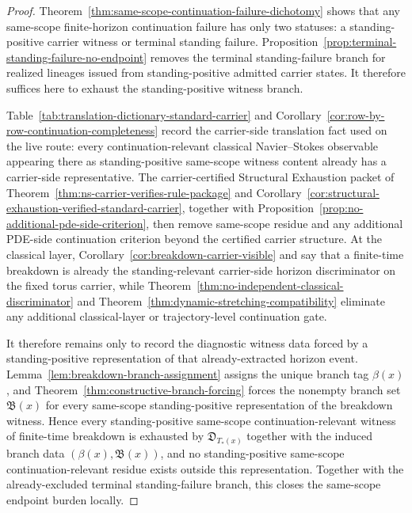 \begin{proof}
Theorem~\ref{thm:same-scope-continuation-failure-dichotomy} shows that any same-scope finite-horizon continuation failure has only two statuses: a standing-positive carrier witness or terminal standing failure. Proposition~\ref{prop:terminal-standing-failure-no-endpoint} removes the terminal standing-failure branch for realized lineages issued from standing-positive admitted carrier states. It therefore suffices here to exhaust the standing-positive witness branch.

Table~\ref{tab:translation-dictionary-standard-carrier} and Corollary~\ref{cor:row-by-row-continuation-completeness} record the carrier-side translation fact used on the live route: every continuation-relevant classical Navier--Stokes observable appearing there as standing-positive same-scope witness content already has a carrier-side representative. The carrier-certified Structural Exhaustion packet of Theorem~\ref{thm:ns-carrier-verifies-rule-package} and Corollary~\ref{cor:structural-exhaustion-verified-standard-carrier}, together with Proposition~\ref{prop:no-additional-pde-side-criterion}, then remove same-scope residue and any additional PDE-side continuation criterion beyond the certified carrier structure. At the classical layer, Corollary~\ref{cor:breakdown-carrier-visible} and \HorizonDetectabilityRef{} say that a finite-time breakdown is already the standing-relevant carrier-side horizon discriminator on the fixed torus carrier, while Theorem~\ref{thm:no-independent-classical-discriminator} and Theorem~\ref{thm:dynamic-stretching-compatibility} eliminate any additional classical-layer or trajectory-level continuation gate.

It therefore remains only to record the diagnostic witness data forced by a standing-positive representation of that already-extracted horizon event. Lemma~\ref{lem:breakdown-branch-assignment} assigns the unique branch tag $\beta(x)$, and Theorem~\ref{thm:constructive-branch-forcing} forces the nonempty branch set $\mathfrak B(x)$ for every same-scope standing-positive representation of the breakdown witness. Hence every standing-positive same-scope continuation-relevant witness of finite-time breakdown is exhausted by $\mathfrak D_{T_*(x)}$ together with the induced branch data $(\beta(x),\mathfrak B(x))$, and no standing-positive same-scope continuation-relevant residue exists outside this representation. Together with the already-excluded terminal standing-failure branch, this closes the same-scope endpoint burden locally.
\end{proof}

